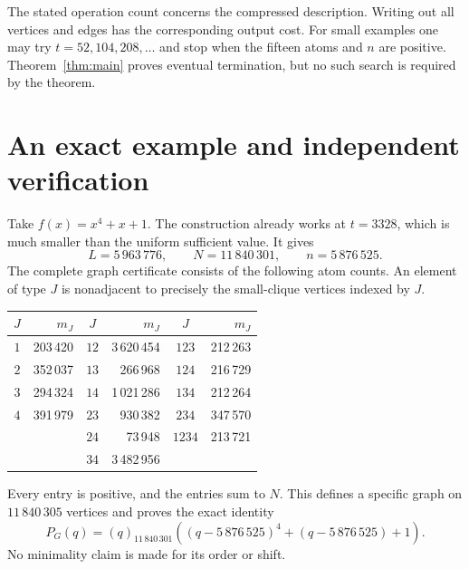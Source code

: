 \documentclass[11pt,a4paper]{article}
\theoremstyle{definition}
\newcommand{\fall}[2]{(#1)_{#2}}
\begin{document}
The stated operation count concerns the compressed description. Writing
out all vertices and edges has the corresponding output cost.
For small examples one may try $t=52,104,208,\ldots$ and stop when the
fifteen atoms and $n$ are positive. Theorem~\ref{thm:main} proves eventual
termination, but no such search is required by the theorem.

\section{An exact example and independent verification}\label{sec:example}

Take $f(x)=x^4+x+1$. The construction already works at $t=3328$, which
is much smaller than the uniform sufficient value. It gives
\[
 L=5\,963\,776,\qquad N=11\,840\,301,\qquad n=5\,876\,525.
\]
The complete graph certificate consists of the following atom counts.
An element of type $J$ is nonadjacent to precisely the small-clique
vertices indexed by $J$.
\begin{center}
\begin{tabular}{cr@{\qquad}cr@{\qquad}cr}
\toprule
$J$ & $m_J$ & $J$ & $m_J$ & $J$ & $m_J$\\
\midrule
$1$ & 203\,420 & $12$ & 3\,620\,454 & $123$ & 212\,263\\
$2$ & 352\,037 & $13$ & 266\,968 & $124$ & 216\,729\\
$3$ & 294\,324 & $14$ & 1\,021\,286 & $134$ & 212\,264\\
$4$ & 391\,979 & $23$ & 930\,382 & $234$ & 347\,570\\
 & & $24$ & 73\,948 & $1234$ & 213\,721\\
 & & $34$ & 3\,482\,956 & &\\
\bottomrule
\end{tabular}
\end{center}
Every entry is positive, and the entries sum to $N$. This defines a
specific graph on $11\,840\,305$ vertices and proves the exact identity
\[
 P_G(q)=\fall q{11\,840\,301}
 \left((q-5\,876\,525)^4+(q-5\,876\,525)+1\right).
\]
No minimality claim is made for its order or shift.
\end{document}

